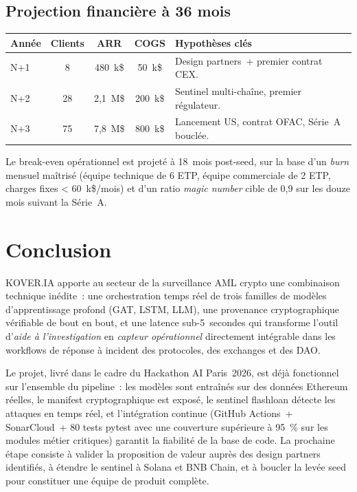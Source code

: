 \documentclass[11pt,a4paper]{article}
\begin{document}
\subsection{Projection financière à 36 mois}

\begin{tabularx}{\linewidth}{@{}lcccX@{}}
\toprule
\textbf{Année} & \textbf{Clients} & \textbf{ARR} & \textbf{COGS} & \textbf{Hypothèses clés} \\
\midrule
N+1 & 8   & 480~k\$    & 50~k\$  & Design partners~+ premier contrat CEX. \\
N+2 & 28  & 2,1~M\$    & 200~k\$ & Sentinel multi-chaîne, premier régulateur. \\
N+3 & 75  & 7,8~M\$    & 800~k\$ & Lancement US, contrat OFAC, Série~A bouclée. \\
\bottomrule
\end{tabularx}

\medskip

Le break-even opérationnel est projeté à 18~mois post-seed, sur la base
d'un \emph{burn} mensuel maîtrisé (équipe technique de 6 ETP, équipe
commerciale de 2 ETP, charges fixes < 60~k\$/mois) et d'un ratio
\emph{magic number} cible de 0,9 sur les douze mois suivant la Série~A.

\section{Conclusion}

\textsc{KOVER.IA} apporte au secteur de la surveillance AML crypto une
combinaison technique inédite~: une orchestration temps réel de trois
familles de modèles d'apprentissage profond (GAT, LSTM, LLM), une
provenance cryptographique vérifiable de bout en bout, et une latence
sub-5~secondes qui transforme l'outil d'\emph{aide à l'investigation}
en \emph{capteur opérationnel} directement intégrable dans les workflows
de réponse à incident des protocoles, des exchanges et des DAO.

Le projet, livré dans le cadre du Hackathon AI Paris~2026, est déjà
fonctionnel sur l'ensemble du pipeline~: les modèles sont entraînés sur
des données Ethereum réelles, le manifest cryptographique est exposé,
le sentinel flashloan détecte les attaques en temps réel, et l'intégration
continue (GitHub Actions~+ SonarCloud~+ 80 tests pytest avec une
couverture supérieure à 95~\% sur les modules métier critiques) garantit
la fiabilité de la base de code. La prochaine étape consiste à valider la
proposition de valeur auprès des design partners identifiés, à étendre
le sentinel à Solana et BNB Chain, et à boucler la levée seed pour
constituer une équipe de produit complète.
\end{document}
